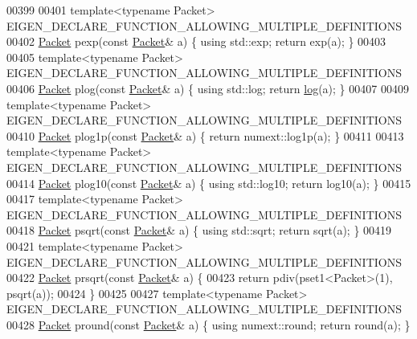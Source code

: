 \begin{DoxyCode}
{00399 
00401 \textcolor{keyword}{template}<\textcolor{keyword}{typename} Packet> EIGEN\_DECLARE\_FUNCTION\_ALLOWING\_MULTIPLE\_DEFINITIONS
00402 \hyperlink{union_eigen_1_1internal_1_1_packet}{Packet} pexp(\textcolor{keyword}{const} \hyperlink{union_eigen_1_1internal_1_1_packet}{Packet}& a) \{ \textcolor{keyword}{using} std::exp; \textcolor{keywordflow}{return} exp(a); \}
00403 
00405 \textcolor{keyword}{template}<\textcolor{keyword}{typename} Packet> EIGEN\_DECLARE\_FUNCTION\_ALLOWING\_MULTIPLE\_DEFINITIONS
00406 \hyperlink{union_eigen_1_1internal_1_1_packet}{Packet} plog(\textcolor{keyword}{const} \hyperlink{union_eigen_1_1internal_1_1_packet}{Packet}& a) \{ \textcolor{keyword}{using} std::log; \textcolor{keywordflow}{return} \hyperlink{structlog}{log}(a); \}
00407 
00409 \textcolor{keyword}{template}<\textcolor{keyword}{typename} Packet> EIGEN\_DECLARE\_FUNCTION\_ALLOWING\_MULTIPLE\_DEFINITIONS
00410 \hyperlink{union_eigen_1_1internal_1_1_packet}{Packet} plog1p(\textcolor{keyword}{const} \hyperlink{union_eigen_1_1internal_1_1_packet}{Packet}& a) \{ \textcolor{keywordflow}{return} numext::log1p(a); \}
00411 
00413 \textcolor{keyword}{template}<\textcolor{keyword}{typename} Packet> EIGEN\_DECLARE\_FUNCTION\_ALLOWING\_MULTIPLE\_DEFINITIONS
00414 \hyperlink{union_eigen_1_1internal_1_1_packet}{Packet} plog10(\textcolor{keyword}{const} \hyperlink{union_eigen_1_1internal_1_1_packet}{Packet}& a) \{ \textcolor{keyword}{using} std::log10; \textcolor{keywordflow}{return} log10(a); \}
00415 
00417 \textcolor{keyword}{template}<\textcolor{keyword}{typename} Packet> EIGEN\_DECLARE\_FUNCTION\_ALLOWING\_MULTIPLE\_DEFINITIONS
00418 \hyperlink{union_eigen_1_1internal_1_1_packet}{Packet} psqrt(\textcolor{keyword}{const} \hyperlink{union_eigen_1_1internal_1_1_packet}{Packet}& a) \{ \textcolor{keyword}{using} std::sqrt; \textcolor{keywordflow}{return} sqrt(a); \}
00419 
00421 \textcolor{keyword}{template}<\textcolor{keyword}{typename} Packet> EIGEN\_DECLARE\_FUNCTION\_ALLOWING\_MULTIPLE\_DEFINITIONS
00422 \hyperlink{union_eigen_1_1internal_1_1_packet}{Packet} prsqrt(\textcolor{keyword}{const} \hyperlink{union_eigen_1_1internal_1_1_packet}{Packet}& a) \{
00423   \textcolor{keywordflow}{return} pdiv(pset1<Packet>(1), psqrt(a));
00424 \}
00425 
00427 \textcolor{keyword}{template}<\textcolor{keyword}{typename} Packet> EIGEN\_DECLARE\_FUNCTION\_ALLOWING\_MULTIPLE\_DEFINITIONS
00428 \hyperlink{union_eigen_1_1internal_1_1_packet}{Packet} pround(\textcolor{keyword}{const} \hyperlink{union_eigen_1_1internal_1_1_packet}{Packet}& a) \{ \textcolor{keyword}{using} numext::round; \textcolor{keywordflow}{return} round(a); \}
}
\end{DoxyCode}
